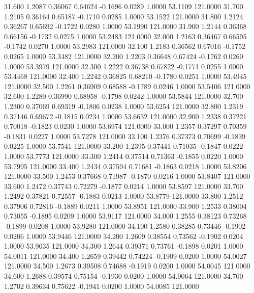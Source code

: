   31.600   1.2087   0.36067   0.64624  -0.1696   0.0289   1.0000  53.1109 121.0000
  31.700   1.2105   0.36164   0.65187  -0.1710   0.0285   1.0000  53.1522 121.0000
  31.800   1.2124   0.36267   0.65692  -0.1722   0.0280   1.0000  53.1990 121.0000
  31.900   1.2144   0.36368   0.66156  -0.1732   0.0275   1.0000  53.2483 121.0000
  32.000   1.2163   0.36467   0.66595  -0.1742   0.0270   1.0000  53.2983 121.0000
  32.100   1.2183   0.36562   0.67016  -0.1752   0.0265   1.0000  53.3482 121.0000
  32.200   1.2203   0.36648   0.67424  -0.1762   0.0260   1.0000  53.3979 121.0000
  32.300   1.2222   0.36738   0.67822  -0.1771   0.0255   1.0000  53.4468 121.0000
  32.400   1.2242   0.36825   0.68210  -0.1780   0.0251   1.0000  53.4945 121.0000
  32.500   1.2261   0.36909   0.68588  -0.1789   0.0246   1.0000  53.5406 121.0000
  32.600   1.2280   0.36990   0.68958  -0.1798   0.0242   1.0000  53.5844 121.0000
  32.700   1.2300   0.37069   0.69319  -0.1806   0.0238   1.0000  53.6254 121.0000
  32.800   1.2319   0.37146   0.69672  -0.1815   0.0234   1.0000  53.6632 121.0000
  32.900   1.2338   0.37221   0.70018  -0.1823   0.0230   1.0000  53.6974 121.0000
  33.000   1.2357   0.37297   0.70359  -0.1831   0.0227   1.0000  53.7278 121.0000
  33.100   1.2376   0.37373   0.70699  -0.1839   0.0225   1.0000  53.7541 121.0000
  33.200   1.2395   0.37441   0.71035  -0.1847   0.0222   1.0000  53.7773 121.0000
  33.300   1.2414   0.37514   0.71363  -0.1855   0.0220   1.0000  53.7995 121.0000
  33.400   1.2434   0.37594   0.71681  -0.1863   0.0218   1.0000  53.8206 121.0000
  33.500   1.2453   0.37668   0.71987  -0.1870   0.0216   1.0000  53.8407 121.0000
  33.600   1.2472   0.37743   0.72279  -0.1877   0.0214   1.0000  53.8597 121.0000
  33.700   1.2492   0.37821   0.72557  -0.1883   0.0213   1.0000  53.8779 121.0000
  33.800   1.2512   0.37906   0.72816  -0.1889   0.0211   1.0000  53.8951 121.0000
  33.900   1.2533   0.38004   0.73055  -0.1895   0.0209   1.0000  53.9117 121.0000
  34.000   1.2555   0.38123   0.73268  -0.1899   0.0208   1.0000  53.9280 121.0000
  34.100   1.2580   0.38285   0.73446  -0.1902   0.0206   1.0000  53.9446 121.0000
  34.200   1.2609   0.38554   0.73562  -0.1902   0.0204   1.0000  53.9635 121.0000
  34.300   1.2644   0.39371   0.73761  -0.1898   0.0201   1.0000  54.0011 121.0000
  34.400   1.2659   0.39442   0.74224  -0.1909   0.0200   1.0000  54.0027 121.0000
  34.500   1.2673   0.39508   0.74688  -0.1919   0.0200   1.0000  54.0045 121.0000
  34.600   1.2688   0.39574   0.75154  -0.1930   0.0200   1.0000  54.0064 121.0000
  34.700   1.2702   0.39634   0.75622  -0.1941   0.0200   1.0000  54.0085 121.0000
